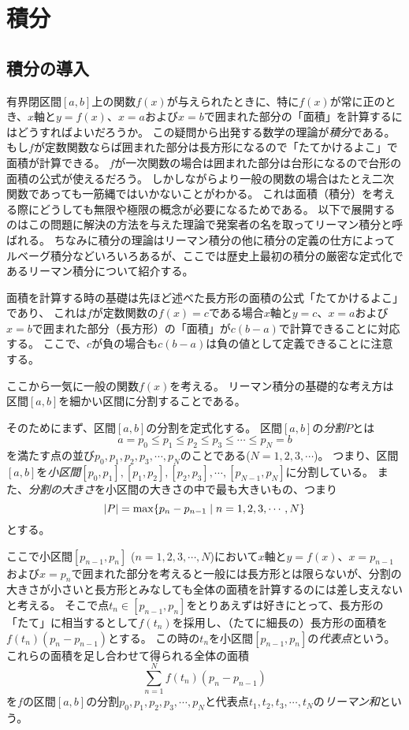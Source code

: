 
\chapter{積分}

\section{積分の導入}

有界閉区間$[a, b]$上の関数$f(x)$が与えられたときに、特に$f(x)$が常に正のとき、$x$軸と$y = f(x)$、$x = a$および$x = b$で囲まれた部分の「面積」を計算するにはどうすればよいだろうか。
この疑問から出発する数学の理論が\emph{積分}である。
もし$f$が定数関数ならば囲まれた部分は長方形になるので「たてかけるよこ」で面積が計算できる。
$f$が一次関数の場合は囲まれた部分は台形になるので台形の面積の公式が使えるだろう。
しかしながらより一般の関数の場合はたとえ二次関数であっても一筋縄ではいかないことがわかる。
これは面積（積分）を考える際にどうしても無限や極限の概念が必要になるためである。
以下で展開するのはこの問題に解決の方法を与えた理論で発案者の名を取ってリーマン積分と呼ばれる。
ちなみに積分の理論はリーマン積分の他に積分の定義の仕方によってルベーグ積分などいろいろあるが、ここでは歴史上最初の積分の厳密な定式化であるリーマン積分について紹介する。

面積を計算する時の基礎は先ほど述べた長方形の面積の公式「たてかけるよこ」であり、
これは$f$が定数関数の$f(x) = c$である場合$x$軸と$y = c$、$x = a$および$x = b$で囲まれた部分（長方形）の「面積」が$c(b-a)$で計算できることに対応する。
ここで、$c$が負の場合も$c(b-a)$は負の値として定義できることに注意する。

ここから一気に一般の関数$f(x)$を考える。
リーマン積分の基礎的な考え方は区間$[a, b]$を細かい区間に分割することである。

そのためにまず、区間$[a, b]$の分割を定式化する。
区間$[a, b]$の\emph{分割}$P$とは
$$
a = p_0 \le p_1 \le p_2 \le p_3 \le \cdots \le p_N = b
$$
を満たす点の並び$p_0, p_1, p_2, p_3, \cdots, p_N$のことである($N = 1, 2, 3, \cdots$)。
つまり、区間$[a, b]$を\emph{小区間}$[p_0, p_1], [p_1, p_2], [p_2, p_3], \cdots, [p_{N-1}, p_N]$に分割している。
また、\emph{分割の大きさ}を小区間の大きさの中で最も大きいもの、つまり
$$
\abs{P} = \max\{ p_n-p_{n-1} \mid n = 1, 2, 3, \cdots, N \}
$$
とする。

ここで小区間$[p_{n-1}, p_n]$ ($n = 1, 2, 3, \cdots, N$)において$x$軸と$y = f(x)$、$x = p_{n-1}$および$x = p_n$で囲まれた部分を考えると一般には長方形とは限らないが、分割の大きさが小さいと長方形とみなしても全体の面積を計算するのには差し支えないと考える。
そこで点$t_n \in [p_{n-1}, p_n]$をとりあえずは好きにとって、長方形の「たて」に相当するとして$f(t_n)$を採用し、（たてに細長の）長方形の面積を$f(t_n)(p_n-p_{n-1})$とする。
この時の$t_n$を小区間$[p_{n-1}, p_n]$の\emph{代表点}という。
これらの面積を足し合わせて得られる全体の面積
$$
\sum_{n = 1}^N f(t_n)(p_n-p_{n-1})
$$
を$f$の区間$[a, b]$の分割$p_0, p_1, p_2, p_3, \cdots, p_N$と代表点$t_1, t_2, t_3, \cdots, t_N$の\emph{リーマン和}という。

